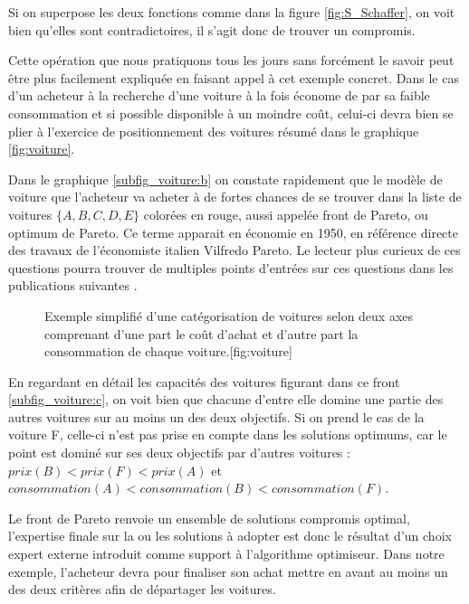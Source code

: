 Si on superpose les deux fonctions comme dans la figure \ref{fig:S_Schaffer}, on voit bien qu'elles sont contradictoires, il s'agit donc de trouver un compromis. 

Cette opération que nous pratiquons tous les jours sans forcément le savoir peut être plus facilement expliquée en faisant appel à cet exemple concret. Dans le cas d'un acheteur à la recherche d'une voiture à la fois économe de par sa faible consommation et si possible disponible à un moindre coût, celui-ci devra bien se plier à l'exercice de positionnement des voitures résumé dans le graphique \ref{fig:voiture}. 

Dans le graphique \ref{subfig_voiture:b} on constate rapidement que le modèle de voiture que l'acheteur va acheter à de fortes chances de se trouver dans la liste de voitures $\{ A,B,C,D,E \}$ colorées en rouge, aussi appelée front de Pareto, ou optimum de Pareto. Ce terme apparait en économie en 1950, en référence directe des travaux de l'économiste italien Vilfredo Pareto. Le lecteur plus curieux de ces questions pourra trouver de multiples points d'entrées sur ces questions dans les publications suivantes \autocites{Ehrgott2012,Koksalan2011,Koksalan2013}. 

\begin{figure}[!htbp]
	\begin{sidecaption}[fortoc]{Exemple simplifié d'une catégorisation de voitures selon deux axes comprenant d'une part le coût d'achat et d'autre part la consommation de chaque voiture.}[fig:voiture]
	\centering
	  \qquad
 \end{sidecaption}
\end{figure}

\sloppy En regardant en détail les capacités des voitures figurant dans ce front \ref{subfig_voiture:c}, on voit bien que chacune d'entre elle domine une partie des autres voitures sur au moins un des deux objectifs. Si on prend le cas de la voiture F, celle-ci n'est pas prise en compte dans les solutions optimums, car le point est dominé sur ses deux objectifs par d'autres voitures : $ prix(B) < prix(F) < prix(A) $ et $consommation(A) < consommation (B) < consommation(F)$.

Le front de Pareto renvoie un ensemble de solutions compromis optimal, l'expertise finale sur la ou les solutions à adopter est donc le résultat d'un choix expert externe introduit comme support à l'algorithme optimiseur. Dans notre exemple, l'acheteur devra pour finaliser son achat mettre en avant au moins un des deux critères afin de départager les voitures.

